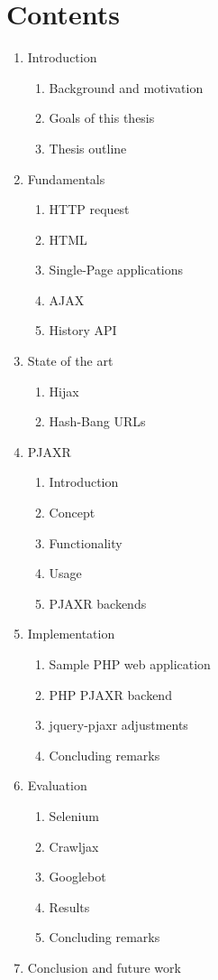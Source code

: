\documentclass[f,bachelor,binding,twoside,palatino]{WeSTthesis}
\def \ajax {AJAX}
\def \pjaxr {PJAXR}
\def \jqueryPjaxr {jquery-pjaxr}
\def \httpRequest {HTTP request}
\begin{document}
\section{Contents}

\begin{enumerate}
  \item Introduction
  \begin{enumerate}[label*=\arabic*.]
    \item Background and motivation
    \item Goals of this thesis
    \item Thesis outline
  \end{enumerate}
  \item Fundamentals
  \begin{enumerate}[label*=\arabic*.]
    \item \httpRequest{}
    \item HTML
    \item Single-Page applications
    \item \ajax{}
    \item History API
  \end{enumerate}
  \item State of the art
  \begin{enumerate}[label*=\arabic*.]
    \item Hijax
    \item Hash-Bang URLs
  \end{enumerate}
  \item \pjaxr{}
  \begin{enumerate}[label*=\arabic*.]
    \item Introduction
    \item Concept
    \item Functionality
    \item Usage
    \item \pjaxr{} backends
  \end{enumerate}
  \item Implementation
  \begin{enumerate}[label*=\arabic*.]
    \item Sample PHP web application
    \item PHP \pjaxr{} backend
    \item \jqueryPjaxr{} adjustments
    \item Concluding remarks
  \end{enumerate}
  \item Evaluation
  \begin{enumerate}[label*=\arabic*.]
    \item Selenium
    \item Crawljax
    \item Googlebot
    \item Results
    \item Concluding remarks
  \end{enumerate}
  \item Conclusion and future work

\end{enumerate}
\end{document}
